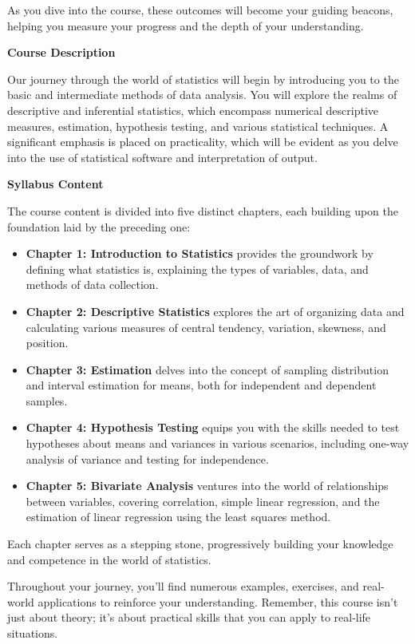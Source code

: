 \documentclass[
  a4paper,
  DIV=11,
  numbers=noendperiod,
  oneside]{scrreprt}
\begin{document}
As you dive into the course, these outcomes will become your guiding
beacons, helping you measure your progress and the depth of your
understanding.

\textbf{Course Description}

Our journey through the world of statistics will begin by introducing
you to the basic and intermediate methods of data analysis. You will
explore the realms of descriptive and inferential statistics, which
encompass numerical descriptive measures, estimation, hypothesis
testing, and various statistical techniques. A significant emphasis is
placed on practicality, which will be evident as you delve into the use
of statistical software and interpretation of output.

\textbf{Syllabus Content}

The course content is divided into five distinct chapters, each building
upon the foundation laid by the preceding one:

\begin{itemize}
\item
  \textbf{Chapter 1: Introduction to Statistics} provides the groundwork
  by defining what statistics is, explaining the types of variables,
  data, and methods of data collection.
\item
  \textbf{Chapter 2: Descriptive Statistics} explores the art of
  organizing data and calculating various measures of central tendency,
  variation, skewness, and position.
\item
  \textbf{Chapter 3: Estimation} delves into the concept of sampling
  distribution and interval estimation for means, both for independent
  and dependent samples.
\item
  \textbf{Chapter 4: Hypothesis Testing} equips you with the skills
  needed to test hypotheses about means and variances in various
  scenarios, including one-way analysis of variance and testing for
  independence.
\item
  \textbf{Chapter 5: Bivariate Analysis} ventures into the world of
  relationships between variables, covering correlation, simple linear
  regression, and the estimation of linear regression using the least
  squares method.
\end{itemize}

Each chapter serves as a stepping stone, progressively building your
knowledge and competence in the world of statistics.

Throughout your journey, you'll find numerous examples, exercises, and
real-world applications to reinforce your understanding. Remember, this
course isn't just about theory; it's about practical skills that you can
apply to real-life situations.
\end{document}
